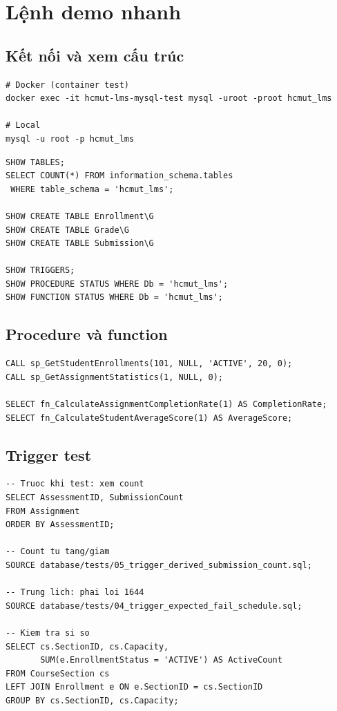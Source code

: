 \documentclass[a4paper,13pt]{extarticle}
\begin{document}
\section{Lệnh demo nhanh}

\subsection{Kết nối và xem cấu trúc}

\begin{lstlisting}[style=shell]
# Docker (container test)
docker exec -it hcmut-lms-mysql-test mysql -uroot -proot hcmut_lms

# Local
mysql -u root -p hcmut_lms
\end{lstlisting}

\begin{lstlisting}[style=sql]
SHOW TABLES;
SELECT COUNT(*) FROM information_schema.tables
 WHERE table_schema = 'hcmut_lms';

SHOW CREATE TABLE Enrollment\G
SHOW CREATE TABLE Grade\G
SHOW CREATE TABLE Submission\G

SHOW TRIGGERS;
SHOW PROCEDURE STATUS WHERE Db = 'hcmut_lms';
SHOW FUNCTION STATUS WHERE Db = 'hcmut_lms';
\end{lstlisting}

\subsection{Procedure và function}

\begin{lstlisting}[style=sql]
CALL sp_GetStudentEnrollments(101, NULL, 'ACTIVE', 20, 0);
CALL sp_GetAssignmentStatistics(1, NULL, 0);

SELECT fn_CalculateAssignmentCompletionRate(1) AS CompletionRate;
SELECT fn_CalculateStudentAverageScore(1) AS AverageScore;
\end{lstlisting}

\subsection{Trigger test}

\begin{lstlisting}[style=sql]
-- Truoc khi test: xem count
SELECT AssessmentID, SubmissionCount
FROM Assignment
ORDER BY AssessmentID;

-- Count tu tang/giam
SOURCE database/tests/05_trigger_derived_submission_count.sql;

-- Trung lich: phai loi 1644
SOURCE database/tests/04_trigger_expected_fail_schedule.sql;

-- Kiem tra si so
SELECT cs.SectionID, cs.Capacity,
       SUM(e.EnrollmentStatus = 'ACTIVE') AS ActiveCount
FROM CourseSection cs
LEFT JOIN Enrollment e ON e.SectionID = cs.SectionID
GROUP BY cs.SectionID, cs.Capacity;
\end{lstlisting}
\end{document}
